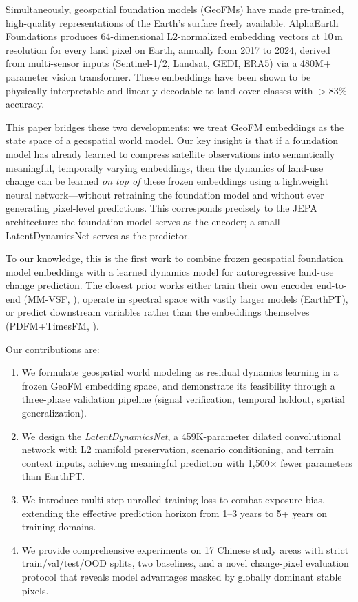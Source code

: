 \documentclass{article}
\begin{document}
Simultaneously, geospatial foundation models (GeoFMs) have made pre-trained, high-quality representations of the Earth's surface freely available. AlphaEarth Foundations \citep{brown2025alphaearth} produces 64-dimensional L2-normalized embedding vectors at 10\,m resolution for every land pixel on Earth, annually from 2017 to 2024, derived from multi-sensor inputs (Sentinel-1/2, Landsat, GEDI, ERA5) via a 480M+ parameter vision transformer. These embeddings have been shown to be physically interpretable \citep{rahman2026interpretable} and linearly decodable to land-cover classes with $>$83\% accuracy.

This paper bridges these two developments: we treat GeoFM embeddings as the state space of a geospatial world model. Our key insight is that if a foundation model has already learned to compress satellite observations into semantically meaningful, temporally varying embeddings, then the dynamics of land-use change can be learned \textit{on top of} these frozen embeddings using a lightweight neural network---without retraining the foundation model and without ever generating pixel-level predictions. This corresponds precisely to the JEPA architecture: the foundation model serves as the encoder; a small LatentDynamicsNet serves as the predictor.

To our knowledge, this is the first work to combine frozen geospatial foundation model embeddings with a learned dynamics model for autoregressive land-use change prediction. The closest prior works either train their own encoder end-to-end (MM-VSF, \citealt{mmvsf2024}), operate in spectral space with vastly larger models (EarthPT), or predict downstream variables rather than the embeddings themselves (PDFM+TimesFM, \citealt{google2024pdfm}).

Our contributions are:

\begin{enumerate}
\item We formulate geospatial world modeling as residual dynamics learning in a frozen GeoFM embedding space, and demonstrate its feasibility through a three-phase validation pipeline (signal verification, temporal holdout, spatial generalization).

\item We design the \textit{LatentDynamicsNet}, a 459K-parameter dilated convolutional network with L2 manifold preservation, scenario conditioning, and terrain context inputs, achieving meaningful prediction with 1{,}500$\times$ fewer parameters than EarthPT.

\item We introduce multi-step unrolled training loss to combat exposure bias, extending the effective prediction horizon from 1--3 years to 5+ years on training domains.

\item We provide comprehensive experiments on 17 Chinese study areas with strict train/val/test/OOD splits, two baselines, and a novel change-pixel evaluation protocol that reveals model advantages masked by globally dominant stable pixels.
\end{enumerate}
\end{document}
